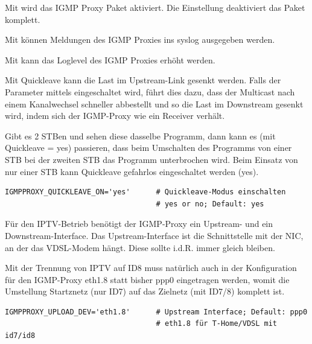 \begin{description}


Mit  wird das IGMP Proxy Paket aktiviert. Die Einstellung 
deaktiviert das Paket komplett.


Mit  können Meldungen des IGMP Proxies ins syslog ausgegeben werden.


Mit  kann das Loglevel des IGMP Proxies erhöht werden.


Mit Quickleave kann die Last im Upstream-Link gesenkt werden. Falls der
Parameter mittels  eingeschaltet wird, führt dies dazu, dass der
Multicast nach einem Kanalwechsel schneller abbestellt und so die Last im
Downstream gesenkt wird, indem sich der IGMP-Proxy wie ein Receiver verhält.

Gibt es 2 STBen und sehen diese dasselbe Programm, dann kann es (mit Quickleave
= yes) passieren, dass beim Umschalten des Programms von einer STB bei der
zweiten STB das Programm unterbrochen wird. Beim Einsatz von nur einer STB kann
Quickleave gefahrlos eingeschaltet werden (yes).

\begin{example}
\begin{verbatim}
IGMPPROXY_QUICKLEAVE_ON='yes'      # Quickleave-Modus einschalten
                                   # yes or no; Default: yes
\end{verbatim}
\end{example}


Für den IPTV-Betrieb benötigt der IGMP-Proxy ein Upstream- und ein
Downstream-Interface. Das Upstream-Interface ist die Schnittstelle mit der NIC,
an der das VDSL-Modem hängt. Diese sollte i.d.R. immer gleich bleiben.

Mit der Trennung von IPTV auf ID8 muss natürlich auch in der Konfiguration für
den IGMP-Proxy eth1.8 statt bisher ppp0 eingetragen werden, womit die Umstellung
Startznetz (nur ID7) auf das Zielnetz (mit ID7/8) komplett ist.

\begin{example}
\begin{verbatim}
IGMPPROXY_UPLOAD_DEV='eth1.8'      # Upstream Interface; Default: ppp0
                                   # eth1.8 für T-Home/VDSL mit id7/id8
\end{verbatim}
\end{example}


\end{description}
